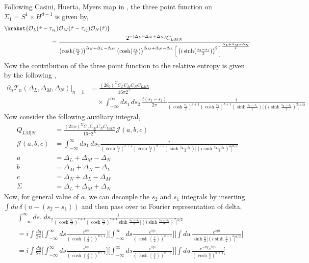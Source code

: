 \documentclass[11pt]{article}
\newcommand{\p}{\partial}
\newcommand{\mO}{\mathcal{O}}
\newcommand{\nn}{\nonumber}
\newcommand{\lb}{\left(}
\newcommand{\rb}{\right)}
\begin{document}
Following Casini, Huerta, Myers map in \cite{Casini_2011}, the three point function on $\Sigma_1 = S^1 \times H^{d-1}$ is given by,
\begin{align}
    &\braket{\mO_L (\hat \tau - \tau_{s_1})\mO_M(\hat\tau - \tau_{s_2})\mO_N(\hat \tau)} \nn\\&\qquad\qquad\qquad\qquad=\frac{2^{-\lb \Delta_L+\Delta_M+\Delta_N\rb}C_{LMN}}{\lb\cosh(\frac{s_1}{2})\rb^{\Delta_N + \Delta_L -\Delta_M}\lb\cosh(\frac{s_2}{2})\rb^{\Delta_M + \Delta_N -\Delta_L}\Big[\lb i\sinh(\frac{s_2 - s_1}{2})\rb^{2}\Big]^{\frac{\Delta_L + \Delta_M-\Delta_N}{2}}}
\end{align}
Now the contribution of the three point function to the relative entropy is given by the following \cite{S_rosi_2018},
\begin{align}
    \p_n \mathcal{T}_n(\Delta_L,\Delta_M,\Delta_N)|_{n=1}&= \frac{(2\theta_0)^\Sigma C_LC_MC_NC_{LMN}}{16\pi 2^\Sigma}\nn \\&\quad\times\int_{-\infty}^\infty ds_1 \, ds_2 \, \frac{i(s_2 - s_1)}{2\pi} \frac{i}{\lb\cosh\frac{s_1}{2}\rb^{c+1}\lb\cosh\frac{s_2}{2}\rb^{b+1}\lb\sinh\frac{s_2-s_1}{2}\rb\Big[\lb i\sinh\frac{s_2 - s_1}{2}\rb^2\Big]^{a/2}}
\end{align}
Now consider the following auxiliary integral,
\begin{align}
    Q_{LM|N} &= \frac{(2\pi x)^\Sigma C_LC_MC_NC_{LMN}}{16\pi 2^\Sigma}\mathcal{J}(a,b,c) \\
    \mathcal{J}(a,b,c) &= \int_{-\infty}^\infty ds_1 \, ds_2 \frac{i}{\lb\cosh\frac{s_1}{2}\rb^{c+1}\lb\cosh\frac{s_2}{2}\rb^{b+1}\lb\sinh\frac{s_2-s_1}{2}\rb\Big[\lb i\sinh\frac{s_2 - s_1}{2}\rb^2\Big]^{a/2}} \\
    a &= \Delta_L + \Delta_M - \Delta_N \\
    b &= \Delta_M + \Delta_N - \Delta_L \\
    c &= \Delta_N + \Delta_L - \Delta_M \\
    \Sigma &= \Delta_L + \Delta_M + \Delta_N 
\end{align}
Now, for general value of $a$, we can decouple the $s_2$ and $s_1$ integrals by inserting $\int du \, \delta (u - (s_2 - s_1))$ and then pass over to Fourier representation of delta,
\begin{align}
    &\int_{-\infty}^\infty ds_1 \, ds_2 \frac{i}{\lb\cosh\frac{s_1}{2}\rb^{c+1}\lb\cosh\frac{s_2}{2}\rb^{b+1}\sinh\frac{s_2-s_1}{2}\Big[\lb i\sinh\frac{s_2-s_1}{2}\rb^2\Big]^{a/2}} \\&= i\int\frac{dq}{2\pi} \Bigg[\int_{-\infty}^\infty ds\frac{e^{iqs}}{\lb\cosh\lb\frac{s}{2}\rb\rb^{b+1}}\Bigg] \Bigg[\int_{-\infty}^\infty ds\frac{e^{iqs}}{\lb\cosh\lb\frac{s}{2}\rb\rb^{c+1}}\Bigg]  \Bigg[\int du \, \frac{e^{iqu}}{\sinh\frac{u}{2}\Big[\lb i\sinh\frac{u}{2}\rb^{2}\Big]^{a/2}}\Bigg] \\
    &= i\int\frac{dq}{2\pi} \Bigg[\int_{-\infty}^\infty ds\frac{e^{iqs}}{\lb\cosh\lb\frac{s}{2}\rb\rb^{b+1}}\Bigg] \Bigg[\int_{-\infty}^\infty ds\frac{e^{iqs}}{\lb\cosh\lb\frac{s}{2}\rb\rb^{c+1}}\Bigg]  \Bigg[\int du \, \frac{e^{-\pi q}e^{iqu}}{\lb\cosh\frac{u}{2}\rb^{a+1}}\Bigg]
\end{align}
\end{document}
